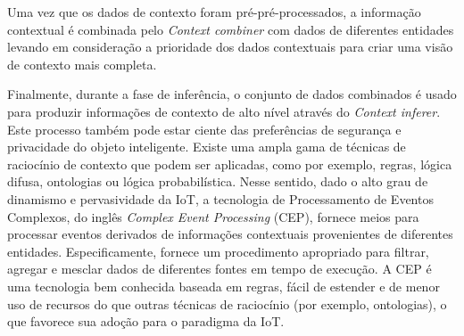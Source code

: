 \documentclass[tid,table]{texufpel} %
\begin{document}
Uma vez que os dados de contexto foram pré-pré-processados, a informação contextual é combinada pelo \textit{Context combiner} com dados de diferentes entidades levando em consideração a prioridade dos dados contextuais para criar uma visão de contexto mais completa. 

Finalmente, durante a fase de inferência, o conjunto de dados combinados é usado para produzir informações de contexto de alto nível através do \textit{Context inferer}. Este processo também pode estar ciente das preferências de segurança e privacidade do objeto inteligente. Existe uma ampla gama de técnicas de raciocínio de contexto que podem ser aplicadas, como por exemplo, regras, lógica difusa, ontologias ou lógica probabilística. Nesse sentido, dado o alto grau de dinamismo e pervasividade da IoT, a tecnologia de Processamento de Eventos Complexos, do inglês \textit{Complex Event Processing} (CEP), fornece meios para processar eventos derivados de informações contextuais provenientes de diferentes entidades. Especificamente, fornece um procedimento apropriado para filtrar, agregar e mesclar dados de diferentes fontes em tempo de execução. A CEP é uma tecnologia bem conhecida baseada em regras, fácil de estender e de menor uso de recursos do que outras técnicas de raciocínio (por exemplo, ontologias), o que favorece sua adoção para o paradigma da IoT.
\end{document}
